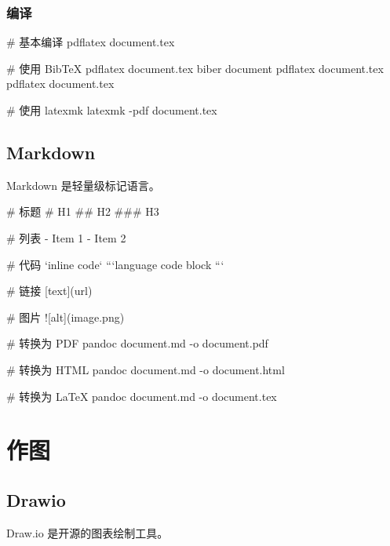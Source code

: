 \subsubsection{编译}


\begin{lstcode}[numbers=none]
  # 基本编译
  pdflatex document.tex

  # 使用 BibTeX
  pdflatex document.tex
  biber document
  pdflatex document.tex
  pdflatex document.tex

  # 使用 latexmk
  latexmk -pdf document.tex
\end{lstcode}

\subsection{Markdown}

Markdown 是轻量级标记语言。


\begin{lstcode}[numbers=none]
  # 标题
  # H1
  ## H2
  ### H3

  # 列表
  - Item 1
  - Item 2

  # 代码
  `inline code`
  ```language
  code block
  ```

  # 链接
  [text](url)

  # 图片
  ![alt](image.png)
\end{lstcode}


\begin{lstcode}[numbers=none]
  # 转换为 PDF
  pandoc document.md -o document.pdf

  # 转换为 HTML
  pandoc document.md -o document.html

  # 转换为 LaTeX
  pandoc document.md -o document.tex
\end{lstcode}

\section{作图}

\subsection{Drawio}

Draw.io 是开源的图表绘制工具。


